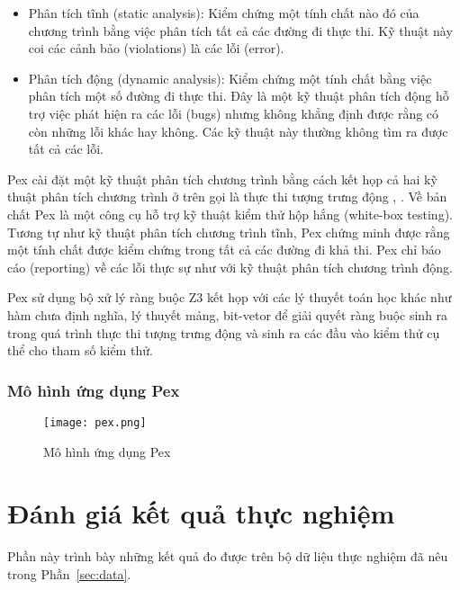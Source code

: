 \begin{itemize}
	\item Phân tích tĩnh (static analysis): Kiểm chứng một tính chất nào đó của chương trình bằng việc phân tích tất cả các đường đi thực thi. Kỹ thuật này coi các cảnh bảo (violations) là các lỗi (error).
	\item Phân tích động (dynamic analysis): Kiểm chứng một tính chất bằng việc phân tích một số đường đi thực thi. Đây là một kỹ thuật phân tích động hỗ trợ việc phát hiện ra các lỗi (bugs) nhưng không khẳng định được rằng có còn những lỗi khác hay không. Các kỹ thuật này thường không tìm ra được tất cả các lỗi.
\end{itemize}

Pex cài đặt một kỹ thuật phân tích chương trình bằng cách kết họp cả hai kỹ thuật phân tích chương trình ở trên gọi là thực thi tượng trưng động \cite{xie2009fitness}, \cite{godefroid2005dart}. Về bản chất Pex là một công cụ hỗ trợ kỹ thuật kiểm thử hộp hắng (white-box testing). Tương tự như kỹ thuật phân tích chương trình tĩnh, Pex chứng minh được rằng một tính chất được kiểm chứng trong tất cả các đường đi khả thi. Pex chỉ báo cáo (reporting) về các lỗi thực sự như với kỹ thuật phân tích chương trình động.

Pex sử dụng bộ xử lý ràng buộc Z3 \cite{de2008z3} kết họp với các lý thuyết toán học khác như hàm chưa định nghĩa, lý thuyết mảng, bit-vetor \cite{kroening2016decision} để giải quyết ràng buộc sinh ra trong quá trình thực thi tượng trưng động và sinh ra các đầu vào kiểm thử cụ thể cho tham số kiểm thử.

\subsubsection*{Mô hình ứng dụng Pex}

\begin{center}
	\begin{figure}[htp]
		\begin{center}
			\texttt{[image: pex.png]}
		\end{center}
		\caption{Mô hình ứng dụng Pex}
		
	\end{figure}
\end{center}

\section{Đánh giá kết quả thực nghiệm}
Phần này trình bày những kết quả đo được trên bộ dữ liệu thực nghiệm đã nêu trong Phần~\ref{sec:data}.

